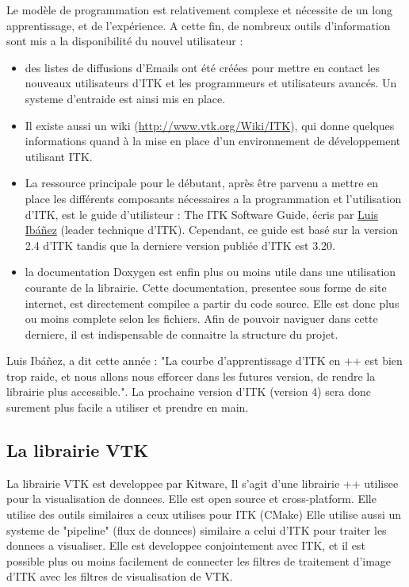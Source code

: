 Le modèle de programmation est relativement complexe et nécessite de un long apprentissage, et de l'expérience. A cette fin, de nombreux outils d'information sont mis a la disponibilité du nouvel utilisateur :
\begin{itemize}
  \item des listes de diffusions d'Emails ont été créées pour mettre en contact les nouveaux utilisateurs d'ITK et les programmeurs et utilisateurs avancés. Un systeme d'entraide est ainsi mis en place. 
  \item Il existe aussi un wiki (\url{http://www.vtk.org/Wiki/ITK}), qui donne quelques informations quand à la mise en place d'un environnement de développement utilisant ITK. 
  \item La ressource principale pour le débutant, après être parvenu a mettre en place les différents composants nécessaires a la programmation et l'utilisation d'ITK, est le guide d'utilisteur : The ITK Software Guide, écris par \href{http://www.kitware.com/company/team/ibanez.html}{Luis Ibáñez} (leader technique d'ITK). Cependant, ce guide est basé sur la version 2.4 d'ITK tandis que la derniere version publiée d'ITK est 3.20.  
  \item la documentation Doxygen est enfin plus ou moins utile dans une utilisation courante de la librairie. Cette documentation, presentee sous forme de site internet, est directement compilee a partir du code source. Elle est donc plus ou moins complete selon les fichiers. Afin de pouvoir naviguer dans cette derniere, il est indispensable de connaitre la structure du projet.
\end{itemize}

Luis Ibáñez, a dit cette année : "La courbe d'apprentissage d'ITK en \C++ est bien trop raide, et nous allons nous efforcer dans les futures version, de rendre la librairie plus accessible.". La prochaine version d'ITK (version 4) sera donc surement plus facile a utiliser et prendre en main.



\subsection{La librairie VTK}

La librairie VTK est developpee par Kitware, Il s'agit d'une librairie \C++ utilisee pour la visualisation de donnees. Elle est open source et cross-platform. Elle utilise des outils similaires a ceux utilises pour ITK (CMake)
Elle utilise aussi un systeme de "pipeline" (flux de donnees) similaire a celui d'ITK pour traiter les donnees a visualiser. Elle est developpee conjointement avec ITK, et il est possible plus ou moins facilement de connecter les filtres de traitement d'image d'ITK avec les filtres de visualisation de VTK.



